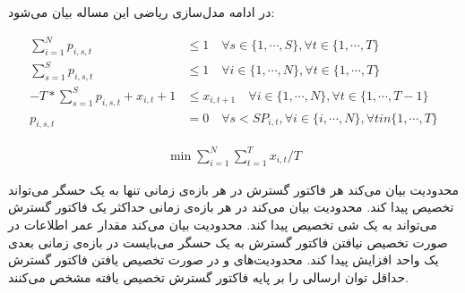 در ادامه مدل‌سازی ریاضی این مساله بیان می‌شود:

\begin{align}
  \sum_{i = 1}^{N} p_{i, s, t} &\le 1 \quad \forall s \in \{1, \cdots, S\}, \forall t \in \{1, \cdots, T\} \label{eq:constr_subchannel_limit} \\
  \sum_{s = 1}^{S} p_{i, s, t} &\le 1 \quad \forall i \in \{1, \cdots, N\}, \forall t \in \{1, \cdots, T\} \label{eq:constr_thing_limit} \\
  -T * \sum_{s = 1}^{S} p_{i, s, t} + x_{i, t} + 1 &\le x_{i, t + 1} \quad \forall i \in \{1, \cdots, N\}, \forall t \in \{1, \cdots, T - 1\} \label{eq:constr_aoi_limit} \\
  p_{i, s, t} &= 0  \quad \forall s < SP_{i, t},  \forall i \in \{i, \cdots, N\}, \forall t in \{1, \cdots, T\}
\end{align}

\begin{align}
  \min \sum_{i = 1}^{N} \sum_{t = 1}^{T} x_{i, t} / T
\end{align}


محدودیت  بیان می‌کند هر فاکتور گسترش در هر بازه‌ی زمانی تنها به یک حسگر می‌تواند تخصیص پیدا کند.
محدودیت  بیان می‌کند در هر بازه‌ی زمانی حداکثر یک فاکتور گسترش می‌تواند به یک شی تخصیص پیدا کند.
محدودیت  بیان می‌کند مقدار عمر اطلاعات در صورت تخصیص نیافتن فاکتور گسترش به یک حسگر می‌بایست در بازه‌ی زمانی بعدی یک واحد افزایش پیدا کند.
محدودیت‌های  و  در صورت تخصیص یافتن فاکتور گسترش حداقل توان ارسالی را بر پایه فاکتور گسترش تخصیص یافته مشخص می‌کنند.
